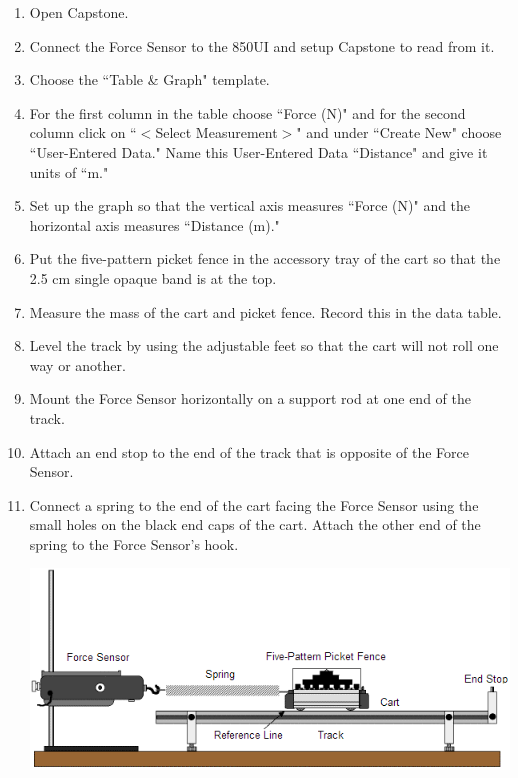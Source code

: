 \documentclass[main.tex]{subfiles}
\begin{document}
\begin{enumerate}
\item
Open Capstone.
\item
Connect the Force Sensor to the 850UI and setup Capstone to read from it.
\item
Choose the ``Table \& Graph" template.
\item
For the first column in the table choose ``Force (N)" and for the second column click on ``$<$Select Measurement$>$" and under ``Create New" choose ``User-Entered Data." Name this User-Entered Data ``Distance" and give it units of ``m."
\item
Set up the graph so that the vertical axis measures ``Force (N)" and the horizontal axis measures ``Distance (m)."
\item
Put the five-pattern picket fence in the accessory tray of the cart so that the 2.5 cm single opaque band is at the top.
\item
Measure the mass of the cart and picket fence. Record this in the data table.
\item
Level the track by using the adjustable feet so that the cart will not roll one way or another.
\item
Mount the Force Sensor horizontally on a support rod at one end of the track.
\item
Attach an end stop to the end of the track that is opposite of the Force Sensor.
\item
Connect a spring to the end of the cart facing the Force Sensor using the small holes on the black end caps of the cart. Attach the other end of the spring to the Force Sensor's hook.

\includegraphics[width=\textwidth]{Harmonics_1_Setup}


\end{enumerate}
\end{document}
